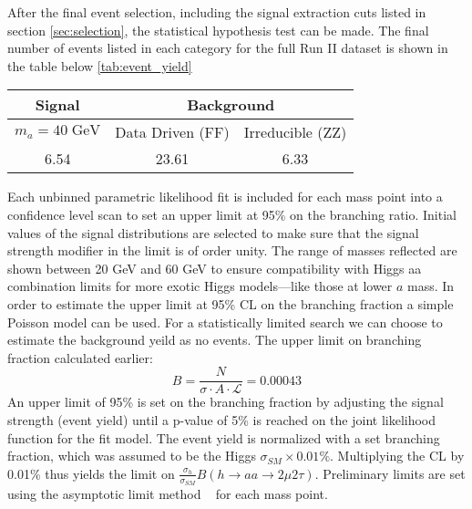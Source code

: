 

After the final event selection, including the signal extraction cuts listed in section \ref{sec:selection}, the statistical hypothesis test can be made. 
The final number of events listed in each category for the full Run II dataset is shown in the table below \ref{tab:event_yield}


\begin{table}[h!tbp]
\centering
{}
\begin{tabular*}{0.6\textwidth}{c|c|c}
\hline
Signal & \multicolumn{2}{c}{Background} \\
\hline $m_a=40\;\text{GeV}$ & Data Driven (FF) & Irreducible (ZZ)\\\hline
6.54   & 23.61 & 6.33 \\\hline
\end{tabular*}
\end{table}
 



Each unbinned parametric likelihood fit is included for each mass point into a confidence level scan to set an upper limit at 95\% on the branching ratio. Initial values of the signal distributions are selected to make sure that the signal strength modifier in the limit is of order unity. The range of masses reflected are shown between 20 GeV and 60 GeV to ensure compatibility with Higgs aa combination limits for more exotic Higgs models---like those at lower $a$ mass. 
In order to estimate the upper limit at 95\% CL on the branching fraction a simple Poisson model can be used. For a statistically limited search we can choose to estimate the background yeild as no events. The upper limit on branching fraction calculated earlier: 
\begin{equation}B =  \frac{N}{\sigma \cdot A\cdot \mathcal{L}} = 0.00043\end{equation} 
An upper limit of 95\% is set on the branching fraction by adjusting the signal strength (event yield) until a p-value of 5\% is reached on the joint likelihood function for the fit model. 
The event yield is normalized with a set branching fraction, which was assumed to be the Higgs $\sigma_{SM} \times 0.01\%$.
Multiplying the CL by 0.01\% thus yields the limit on $\frac{\sigma_h}{\sigma_{SM}} B(h\rightarrow aa\rightarrow2\mu2\tau)$.
Preliminary limits are set using the asymptotic limit method ~\cite{Cowan_2011} for each mass point.


